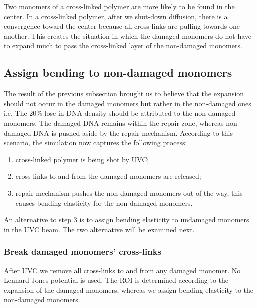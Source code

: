 \documentclass[12pt]{report}
\begin{document}
	  	Two monomers of a cross-linked polymer are more likely to be found in the center. In a cross-linked polymer, after we shut-down diffusion, there is a convergence toward the center because all cross-links are pulling towards one another. This creates the situation in which the damaged monomers do not have to expand much to pass the cross-linked layer of the non-damaged monomers. 
	
	\subsection{Assign bending to non-damaged monomers}
		
		The result of the previous subsection brought us to believe that the expansion should not occur in the damaged monomers but rather in the non-damaged ones i.e. The 20\% lose in DNA density should be attributed to the non-damaged monomers. The damaged DNA remains within the repair zone, whereas non-damaged DNA is pushed aside by the repair mechanism. According to this scenario, the simulation now captures the following process:
		\begin{enumerate}
			\itemsep0em
			\item cross-linked polymer is being shot by UVC;
			\item cross-links to and from the damaged monomers are released;
			\item repair mechanism pushes the non-damaged monomers out of the way, this causes bending elasticity for the non-damaged monomers.
		\end{enumerate}
		
		An alternative to step 3 is to assign bending elasticity to undamaged monomers in the UVC beam. The two alternative will be examined next.
		
	\subsubsection{Break damaged monomers' cross-links}
     After UVC we remove all cross-links to and from any damaged monomer. No Lennard-Jones potential is used. The ROI is determined according to the expansion of the damaged monomers, whereas we assign bending elasticity to the non-damaged monomers. 
          
\end{document}
